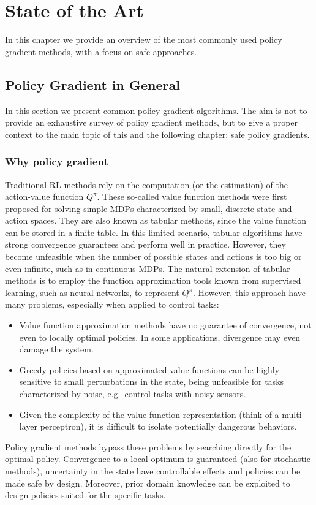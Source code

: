 \chapter{State of the Art}

In this chapter we provide an overview of the most commonly used policy gradient methods, with a focus on safe approaches.


\section{Policy Gradient in General}
In this section we present common policy gradient algorithms. The aim is not to provide an exhaustive survey of policy gradient methods, but to give a proper context to the main topic of this and the following chapter: safe policy gradients.

\subsection{Why policy gradient}\label{sec:why_pg}
Traditional \ac{RL} methods rely on the computation (or the estimation) of the action-value function $Q^{\pi}$. These so-called value function methods were first proposed for solving simple \ac{MDP}s characterized by small, discrete state and action spaces. They are also known as tabular methods, since the value function can be stored in a finite table. In this limited scenario, tabular algorithms have strong convergence guarantees and perform well in practice. However, they become unfeasible when the number of possible states and actions is too big or even infinite, such as in continuous \ac{MDP}s.
The natural extension of tabular methods is to employ the function approximation tools known from supervised learning, such as neural networks, to represent $Q^{\pi}$. However, this approach have many problems, especially when applied to control tasks:
\begin{itemize}
\item Value function approximation methods have no guarantee of convergence, not even to locally optimal policies. In some applications, divergence may even damage the system.
\item Greedy policies based on approximated value functions can be highly sensitive to small perturbations in the state, being unfeasible for tasks characterized by noise, e.g.\ control tasks with noisy sensors.
\item Given the complexity of the value function representation (think of a multi-layer perceptron), it is difficult to isolate potentially dangerous behaviors.
\end{itemize}
Policy gradient methods bypass these problems by searching directly for the optimal policy. Convergence to a local optimum is guaranteed (also for stochastic methods), uncertainty in the state have controllable effects and policies can be made safe by design. Moreover, prior domain knowledge can be exploited to design policies suited for the specific tasks.

